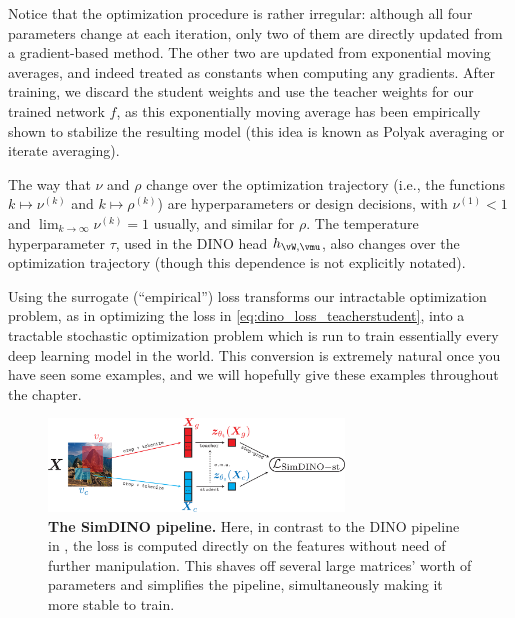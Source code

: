 \documentclass[../../book-main.tex]{subfiles}
\begin{document}
Notice that the optimization procedure is rather irregular: although all four parameters change at each iteration, only two of them are directly updated from a gradient-based method. The other two are updated from exponential moving averages, and indeed treated as constants when computing any gradients. After training, we discard the student weights and use the teacher weights for our trained network \(f\), as this exponentially moving average has been empirically shown to stabilize the resulting model (this idea is known as Polyak averaging or iterate averaging). 

The way that \(\nu\) and \(\rho\) change over the optimization trajectory (i.e., the functions \(k \mapsto \nu^{(k)}\) and \(k \mapsto \rho^{(k)}\)) are hyperparameters or design decisions, with \(\nu^{(1)} < 1\) and \(\lim_{k \to \infty}\nu^{(k)} = 1\) usually, and similar for \(\rho\). The temperature hyperparameter \(\tau\), used in the DINO head \(h_{\vW, \vmu}\), also changes over the optimization trajectory (though this dependence is not explicitly notated).

Using the surrogate (``empirical'') loss transforms our intractable optimization problem, as in optimizing the loss in \eqref{eq:dino_loss_teacherstudent}, into a tractable stochastic optimization problem which is run to train essentially every deep learning model in the world. This conversion is extremely natural once you have seen some examples, and we will hopefully give these examples throughout the chapter. 

\begin{figure}
    \centering 
    \includegraphics[width=0.7\textwidth]{figs_chap7/simdino_pipeline.pdf}
    \caption{\small\textbf{The SimDINO pipeline.} Here, in contrast to the DINO pipeline in , the loss is computed directly on the features without need of further manipulation. This shaves off several large matrices' worth of parameters and simplifies the pipeline, simultaneously making it more stable to train.}\label{fig:simdino_pipeline}
\end{figure}
\end{document}
